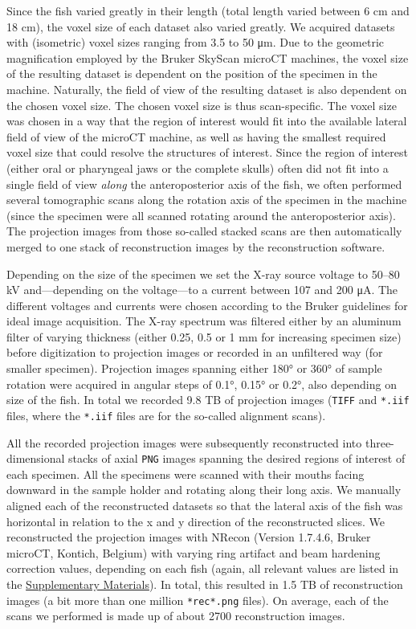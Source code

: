 Since the fish varied greatly in their length (total length varied between 6 cm and 18 cm), the voxel size of each dataset also varied greatly.
We acquired datasets with (isometric) voxel sizes ranging from 3.5 to 50 μm.
Due to the geometric magnification employed by the Bruker SkyScan microCT machines, the voxel size of the resulting dataset is dependent on the position of the specimen in the machine.
Naturally, the field of view of the resulting dataset is also dependent on the chosen voxel size.
The chosen voxel size is thus scan-specific.
The voxel size was chosen in a way that the region of interest would fit into the available lateral field of view of the microCT machine, as well as having the smallest required voxel size that could resolve the structures of interest.
Since the region of interest (either oral or pharyngeal jaws or the complete skulls) often did not fit into a single field of view \emph{along} the anteroposterior axis of the fish, we often performed several tomographic scans along the rotation axis of the specimen in the machine (since the specimen were all scanned rotating around the anteroposterior axis).
The projection images from those so-called stacked scans are then automatically merged to one stack of reconstruction images by the reconstruction software.

Depending on the size of the specimen we set the X-ray source voltage to 50--80 kV and---depending on the voltage---to a current between 107 and 200 μA.
The different voltages and currents were chosen according to the Bruker guidelines for ideal image acquisition.
The X-ray spectrum was filtered either by an aluminum filter of varying thickness (either 0.25, 0.5 or 1 mm for increasing specimen size) before digitization to projection images or recorded in an unfiltered way (for smaller specimen).
Projection images spanning either 180° or 360° of sample rotation were acquired in angular steps of 0.1°, 0.15° or 0.2°, also depending on size of the fish.
In total we recorded 9.8 TB of projection images (\texttt{TIFF} and \texttt{*.iif} files, where the \texttt{*.iif} files are for the so-called alignment scans).

All the recorded projection images were subsequently reconstructed into three-dimensional stacks of axial \texttt{PNG} images spanning the desired regions of interest of each specimen.
All the specimens were scanned with their mouths facing downward in the sample holder and rotating along their long axis.
We manually aligned each of the reconstructed datasets so that the lateral axis of the fish was horizontal in relation to the x and y direction of the reconstructed slices.
We reconstructed the projection images with NRecon (Version 1.7.4.6, Bruker microCT, Kontich, Belgium) with varying ring artifact and beam hardening correction values, depending on each fish (again, all relevant values are listed in the \protect\hyperlink{supplementary-materials}{Supplementary Materials}).
In total, this resulted in 1.5 TB of reconstruction images (a bit more than one million \texttt{*rec*.png} files).
On average, each of the scans we performed is made up of about 2700 reconstruction images.

